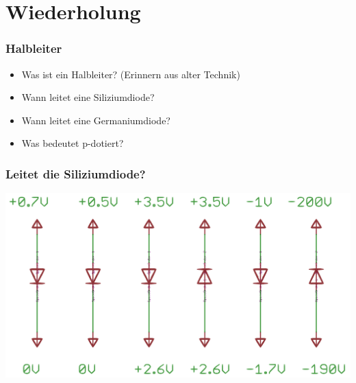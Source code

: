 

\subtitle{Technik A05: \\
  Die Diode und ihre Anwendungen \\[2em]}
\date{Stand 18.05.2016}



\section*{Wiederholung}

\begin{frame}
  \frametitle{Halbleiter}
  \begin{itemize}
    \item Was ist ein Halbleiter? (Erinnern aus alter Technik)
    \item Wann leitet eine Siliziumdiode?
    \item Wann leitet eine Germaniumdiode?
    \item Was bedeutet p-dotiert?
  \end{itemize}
\end{frame}

\begin{frame}
  \frametitle{Leitet die Siliziumdiode?}
  \begin{center}
    \includegraphics[width=1\textwidth,height=.85\textheight,keepaspectratio]{a05/Leit_Diode.png}
  \end{center}
\end{frame}

